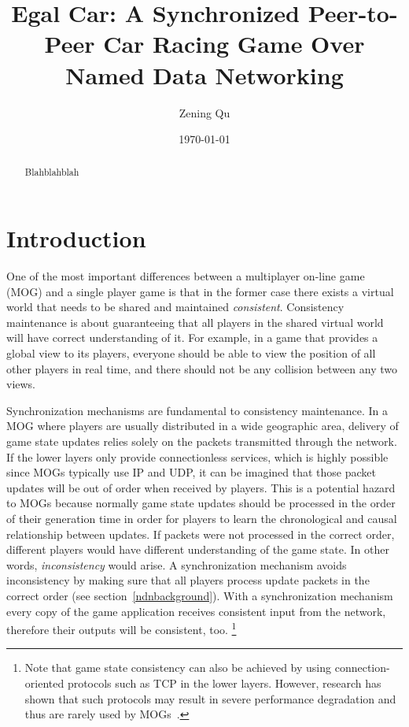 \documentclass{article}
\begin{document}
\title{Egal Car: A Synchronized Peer-to-Peer Car Racing Game Over Named Data Networking}
\author{Zening Qu}
\date{\today}
\maketitle

\begin{abstract}
Blahblahblah
\end{abstract}

\section{Introduction}
\label{introduction}

One of the most important differences between a multiplayer on-line game (MOG) and a single player game is that in the former case there exists a virtual world that needs to be shared and maintained \emph{consistent}. Consistency maintenance is about guaranteeing that all players in the shared virtual world will have correct understanding of it. For example, in a game that provides a global view to its players, everyone should be able to view the position of all other players in real time, and there should not be any collision between any two views. 

Synchronization mechanisms are fundamental to consistency maintenance. In a MOG where players are usually distributed in a wide geographic area, delivery of game state updates relies solely on the packets transmitted through the network. If the lower layers only provide connectionless services, which is highly possible since MOGs typically use IP and UDP, it can be imagined that those packet updates will be out of order when received by players. This is a potential hazard to MOGs because normally game state updates should be processed in the order of their generation time in order for players to learn the chronological and causal relationship between updates. If packets were not processed in the correct order, different players would have different understanding of the game state. In other words, \emph{inconsistency} would arise. A synchronization mechanism avoids inconsistency by making sure that all players process update packets in the correct order (see section~\ref{ndnbackground}). With a synchronization mechanism every copy of the game application receives consistent input from the network, therefore their outputs will be consistent, too.
\footnote{Note that game state consistency can also be achieved by using connection-oriented protocols such as TCP in the lower layers. However, research has shown that such protocols may result in severe performance degradation and thus are rarely used by MOGs~\cite{Fgame}.}
\end{document}
